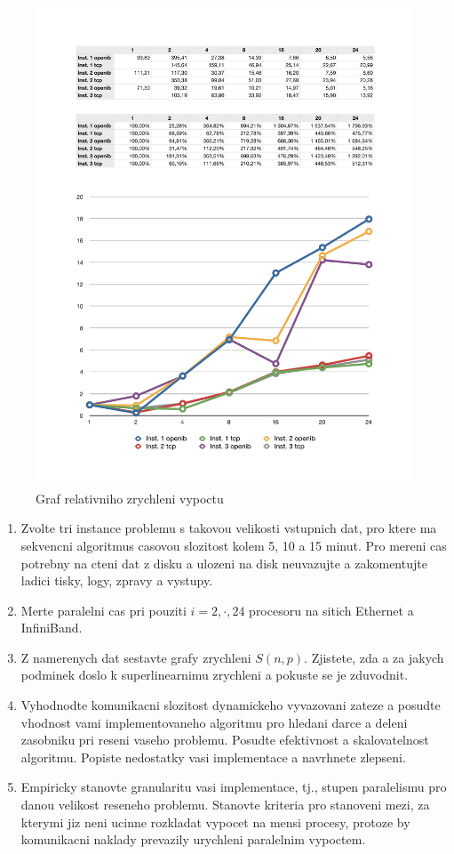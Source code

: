 \documentclass[a4paper]{article}
\begin{document}
\begin{figure}[ht]
\centerline{\includegraphics[width=\textwidth]{graph.pdf}}
\caption{Graf relativniho zrychleni vypoctu}
\label{labelvasehoobrazku}
\end{figure}

\begin{enumerate}
\item Zvolte tri instance problemu s takovou velikosti vstupnich dat, pro ktere ma sekvencni 
algoritmus casovou slozitost kolem 5, 10 a 15 minut.
Pro mereni cas potrebny na cteni dat z disku a ulozeni na disk neuvazujte a zakomentujte
ladici tisky, logy, zpravy a vystupy.
\item Merte paralelni cas pri pouziti $i=2,\cdot,24$ procesoru na sitich Ethernet a InfiniBand.
\item Z namerenych dat sestavte grafy zrychleni $S(n,p)$. Zjistete, zda a za jakych podminek
doslo k superlinearnimu zrychleni a pokuste se je zduvodnit.
\item Vyhodnodte komunikacni slozitost dynamickeho vyvazovani zateze a posudte
vhodnost vami implementovaneho algoritmu pro hledani darce a deleni zasobniku pri reseni vaseho
problemu. Posudte efektivnost a skalovatelnost algoritmu. Popiste nedostatky
vasi implementace a navrhnete zlepseni.
\item Empiricky stanovte 
granularitu vasi implementace, tj., stupen paralelismu pro danou velikost reseneho
problemu. Stanovte kriteria pro stanoveni mezi, za kterymi jiz neni
ucinne rozkladat vypocet na mensi procesy, protoze by komunikacni
naklady prevazily urychleni paralelnim vypoctem.

\end{enumerate}
\end{document}
